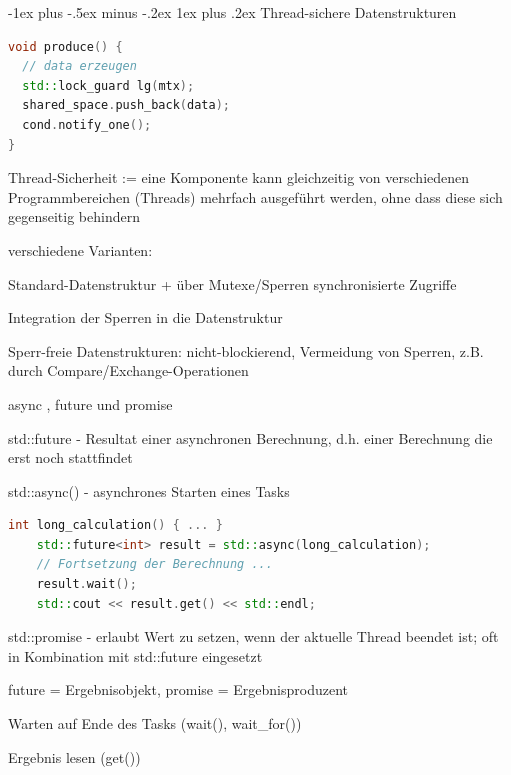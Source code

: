 \documentclass[10pt]{article}
\makeatletter
\renewcommand{\subsubsection}{\@startsection{subsubsection}{3}{0mm}%
                                {-1ex plus -.5ex minus -.2ex}%
                                {1ex plus .2ex}%
                                {\normalfont\small\bfseries}}
\makeatother
\begin{document}
  \subsubsection{Thread-sichere Datenstrukturen}
  \begin{lstlisting}[language=C++]
void produce() {
  // data erzeugen
  std::lock_guard lg(mtx);
  shared_space.push_back(data);
  cond.notify_one();
}
\end{lstlisting}
  \begin{itemize*}
    \item Thread-Sicherheit := eine Komponente kann gleichzeitig von verschiedenen Programmbereichen (Threads) mehrfach ausgeführt werden, ohne dass diese sich gegenseitig behindern
    \item verschiedene Varianten:
    \begin{itemize*}
      \item Standard-Datenstruktur + über Mutexe/Sperren synchronisierte Zugriffe
      \item Integration der Sperren in die Datenstruktur
      \item Sperr-freie Datenstrukturen: nicht-blockierend, Vermeidung von Sperren, z.B. durch Compare/Exchange-Operationen
    \end{itemize*}
    \item async , future und promise
    \item std::future - Resultat einer asynchronen Berechnung, d.h. einer Berechnung die erst noch stattfindet
    \item std::async() - asynchrones Starten eines Tasks
    \begin{lstlisting}[language=C++]
    int long_calculation() { ... }
    std::future<int> result = std::async(long_calculation);
    // Fortsetzung der Berechnung ...
    result.wait();
    std::cout << result.get() << std::endl;
  \end{lstlisting}
    \item std::promise - erlaubt Wert zu setzen, wenn der aktuelle Thread beendet ist; oft in Kombination mit std::future eingesetzt
    \item future = Ergebnisobjekt, promise = Ergebnisproduzent
    \begin{itemize*}
      \item Warten auf Ende des Tasks (wait(), wait\_for())
      \item Ergebnis lesen (get())
    \end{itemize*}
  \end{itemize*}
  
\end{document}
